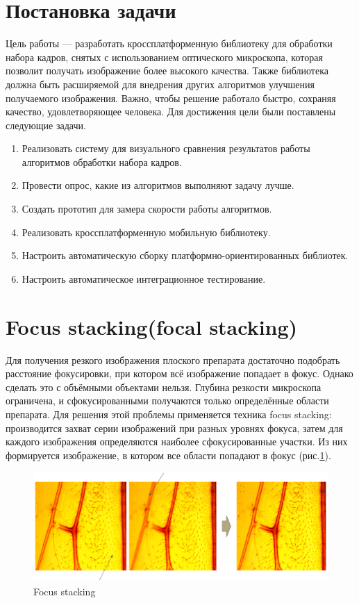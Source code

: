 \documentclass[14pt]{matmex-diploma-custom}
\begin{document}
\section{Постановка задачи}
Цель работы --- разработать кроссплатформенную библиотеку для обработки набора кадров, снятых с использованием оптического микроскопа, которая позволит получать изображение более высокого качества. Также библиотека должна быть расширяемой для внедрения других алгоритмов улучшения получаемого изображения. Важно, чтобы решение работало быстро, сохраняя качество, удовлетворяющее человека. Для достижения цели были поставлены следующие задачи.
\begin{enumerate}
    \item Реализовать систему для визуального сравнения результатов работы алгоритмов обработки набора кадров. 
    \item Провести опрос, какие из алгоритмов выполняют задачу лучше.
    \item Создать прототип для замера скорости работы алгоритмов.
    \item Реализовать кроссплатформенную мобильную библиотеку.
    \item Настроить автоматическую сборку платформно-ориентированных библиотек.
    \item Настроить автоматическое интеграционное тестирование.
\end{enumerate}


\section{Focus stacking(focal stacking)}
Для получения резкого изображения плоского препарата достаточно подобрать расстояние фокусировки, при котором всё изображение попадает в фокус. Однако сделать это с объёмными объектами нельзя. Глубина резкости микроскопа ограничена, и сфокусированными получаются только определённые области препарата. Для решения этой проблемы применяется техника focus stacking: производится захват серии изображений при разных уровнях фокуса, затем для каждого изображения определяются наиболее сфокусированные участки. Из них формируется изображение, в котором все области попадают в фокус (рис.\ref{focus_stacking1}).

\begin{figure}[h]
    \centering
    \includegraphics[width=1.0\textwidth]{figures/fs1.png}
    \caption{Focus stacking}
    \label{focus_stacking1}
\end{figure}
\end{document}
